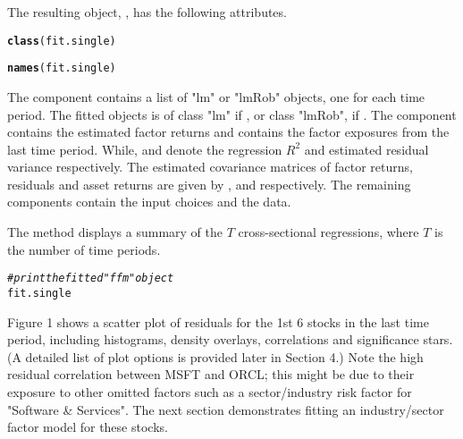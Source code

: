 \documentclass[a4paper]{article}\usepackage[]{graphicx}\usepackage[]{color}
\makeatletter
\newcommand{\hlcom}[1]{\textcolor[rgb]{0.678,0.584,0.686}{\textit{#1}}}%
\newcommand{\hlstd}[1]{\textcolor[rgb]{0.345,0.345,0.345}{#1}}%
\newcommand{\hlkwd}[1]{\textcolor[rgb]{0.737,0.353,0.396}{\textbf{#1}}}%
\newenvironment{kframe}{%
 \def\at@end@of@kframe{}%
 \ifinner\ifhmode%
  \def\at@end@of@kframe{\end{minipage}}%
  \begin{minipage}{\columnwidth}%
 \fi\fi%
 \def\FrameCommand##1{\hskip\@totalleftmargin \hskip-\fboxsep
 \colorbox{shadecolor}{##1}\hskip-\fboxsep
     \hskip-\linewidth \hskip-\@totalleftmargin \hskip\columnwidth}%
 \MakeFramed {\advance\hsize-\width
   \@totalleftmargin\z@ \linewidth\hsize
   \@setminipage}}%
 {\par\unskip\endMakeFramed%
 \at@end@of@kframe}
\newenvironment{knitrout}{}{} %
\makeatother
\begin{document}
The resulting object, , has the following attributes.
\begin{knitrout}
\color{fgcolor}\begin{kframe}
\begin{alltt}
\hlkwd{class}\hlstd{(fit.single)}
\end{alltt}


{\ttfamily\noindent\bfseries\color{errorcolor}{\#\# Error in eval(expr, envir, enclos): object 'fit.single' not found}}\begin{alltt}
\hlkwd{names}\hlstd{(fit.single)}
\end{alltt}


{\ttfamily\noindent\bfseries\color{errorcolor}{\#\# Error in eval(expr, envir, enclos): object 'fit.single' not found}}\end{kframe}
\end{knitrout}

The component  contains a list of "lm" or "lmRob" objects, one for each time period. The fitted objects is of class "lm" if , or class "lmRob", if . The component  contains the estimated factor returns and  contains the factor exposures from the last time period. While,  and  denote the regression $R^2$ and estimated residual variance respectively. The estimated covariance matrices of factor returns, residuals and asset returns are given by ,  and  respectively. The remaining components contain the input choices and the data.

The  method displays a summary of the $T$ cross-sectional regressions, where $T$ is the number of time periods.
\begin{knitrout}
\color{fgcolor}\begin{kframe}
\begin{alltt}
\hlcom{# print the fitted "ffm" object}
\hlstd{fit.single}
\end{alltt}


{\ttfamily\noindent\bfseries\color{errorcolor}{\#\# Error in eval(expr, envir, enclos): object 'fit.single' not found}}\end{kframe}
\end{knitrout}

Figure 1 shows a scatter plot of residuals for the 1st 6 stocks in the last time period, including histograms, density overlays, correlations and significance stars. (A detailed list of plot options is provided later in Section 4.) Note the high residual correlation between MSFT and ORCL; this might be due to their exposure to other omitted factors such as a sector/industry risk factor for "Software \& Services". The next section demonstrates fitting an industry/sector factor model for these stocks.
\end{document}
